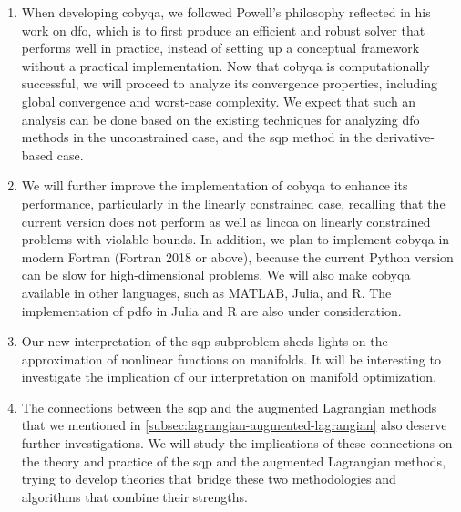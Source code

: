 \begin{enumerate}
    \item When developing \gls{cobyqa}, we followed Powell's philosophy reflected in his work on \gls{dfo}, which is to first produce an efficient and robust solver that performs well in practice, instead of setting up a conceptual framework without a practical implementation.
    Now that \gls{cobyqa} is computationally successful, we will proceed to analyze its convergence properties, including global convergence and worst-case complexity.
    We expect that such an analysis can be done based on the existing techniques for analyzing \gls{dfo} methods in the unconstrained case, and the \gls{sqp} method in the derivative-based case.
    \item We will further improve the implementation of \gls{cobyqa} to enhance its performance, particularly in the linearly constrained case, recalling that the current version does not perform as well as \gls{lincoa} on linearly constrained problems with violable bounds.
    In addition, we plan to implement \gls{cobyqa} in modern Fortran (Fortran 2018 or above), because the current Python version can be slow for high-dimensional problems.
    We will also make \gls{cobyqa} available in other languages, such as MATLAB, Julia, and R.
    The implementation of \gls{pdfo} in Julia and R are also under consideration.
    \item Our new interpretation of the \gls{sqp} subproblem sheds lights on the approximation of nonlinear functions on manifolds.
    It will be interesting to investigate the implication of our interpretation on manifold optimization.
    \item The connections between the \gls{sqp} and the augmented Lagrangian methods that we mentioned in \cref{subsec:lagrangian-augmented-lagrangian} also deserve further investigations.
    We will study the implications of these connections on the theory and practice of the \gls{sqp} and the augmented Lagrangian methods, trying to develop theories that bridge these two methodologies and algorithms that combine their strengths.

\end{enumerate}
